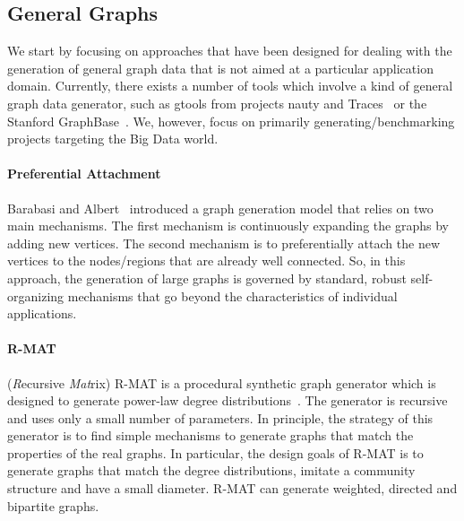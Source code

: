 \subsection{General Graphs}
\label{sec:generators_general}

We start by focusing on approaches that have been designed for dealing with the generation of general graph
data that is not aimed at a particular application domain. Currently, there exists a
number of tools which involve a kind of general graph data generator, such as
gtools from projects nauty and Traces~\cite{gtools} or the Stanford
GraphBase~\cite{GraphBase}. We, however, focus on primarily
generating/benchmarking projects targeting the Big Data world.


\paragraph {Preferential Attachment} Barabasi and Albert~\cite{Barabasi99emergenceScaling} introduced a graph generation model that relies on two main mechanisms. The first mechanism is continuously expanding the graphs by adding new vertices. The second mechanism is to preferentially attach the new vertices   to the nodes/regions that are already well connected. So, in this approach, the generation of large graphs is governed by standard, robust self-organizing mechanisms that go beyond the characteristics of individual applications.

\paragraph {R-MAT} (\emph{R}ecursive \emph{Mat}rix) R-MAT is a procedural synthetic graph generator which is designed to generate power-law degree
distributions~\cite{DBLP:conf/sdm/ChakrabartiZF04}.
The generator is recursive and uses only a small number of parameters.
In principle, the strategy of this generator is to find simple mechanisms to generate graphs that match
the properties of the real graphs. In particular, the design goals of R-MAT is to generate graphs that match the degree distributions, imitate a community structure and have a small diameter. R-MAT can generate weighted, directed and bipartite graphs.

